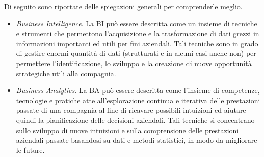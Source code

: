 Di seguito sono riportate delle spiegazioni generali per comprenderle meglio.\cite{academiaedu_bi_and_ba}

\begin{itemize}
    \item \textit{Business Intelligence}. La BI può essere descritta come un insieme di tecniche e strumenti che permettono l'acquisizione e la trasformazione di dati grezzi in informazioni importanti ed utili per fini aziendali. Tali tecniche sono in grado di gestire enormi quantità di dati (strutturati e in alcuni casi anche non) per permettere l'identificazione, lo sviluppo e la creazione di nuove opportunità strategiche utili alla compagnia.
    \item \textit{Business Analytics}. La BA può essere descritta come l'insieme di competenze, tecnologie e pratiche atte all'esplorazione continua e iterativa delle prestazioni passate di una compagnia al fine di ricavare possibili intuizioni ed aiutare quindi la pianificazione delle decisioni aziendali. Tali tecniche si concentrano sullo sviluppo di nuove intuizioni e sulla comprensione delle prestazioni aziendali passate basandosi su dati e metodi statistici, in modo da migliorare le future.
\end{itemize}